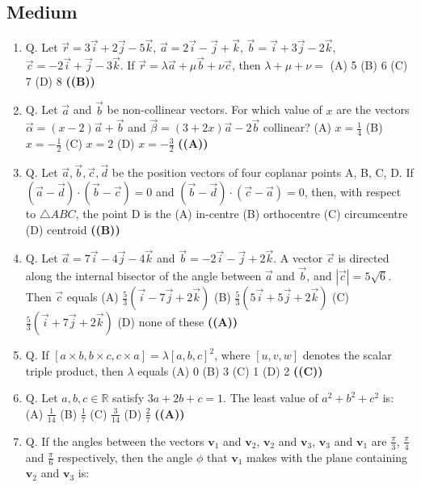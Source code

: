 \documentclass{article}
\begin{document}
\subsection{Medium}
\begin{enumerate}
\item Q. Let $\vec{r} = 3\vec{i} + 2\vec{j} - 5\vec{k}$, $\vec{a} = 2\vec{i} - \vec{j} + \vec{k}$, $\vec{b} = \vec{i} + 3\vec{j} - 2\vec{k}$, $\vec{c} = -2\vec{i} + \vec{j} - 3\vec{k}$. If $\vec{r} = \lambda\vec{a} + \mu\vec{b} + \nu\vec{c}$, then $\lambda + \mu + \nu =$
(A) 5
(B) 6
(C) 7
(D) 8 \hfill \textbf{((B))}
\item Q. Let $\vec{a}$ and $\vec{b}$ be non-collinear vectors. For which value of $x$ are the vectors $\vec{\alpha} = (x - 2)\vec{a} + \vec{b}$ and $\vec{\beta} = (3 + 2x)\vec{a} - 2\vec{b}$ collinear?
(A) $x = \frac{1}{4}$
(B) $x = -\frac{1}{2}$
(C) $x= 2$
(D) $x = -\frac{3}{2}$ \hfill \textbf{((A))}
\item Q. Let $\vec{a}, \vec{b}, \vec{c}, \vec{d}$ be the position vectors of four coplanar points A, B, C, D. If $(\vec{a} - \vec{d}) \cdot (\vec{b} - \vec{c}) = 0$ and $(\vec{b} - \vec{d}) \cdot (\vec{c} - \vec{a}) = 0$, then, with respect to $\triangle ABC$, the point D is the
(A) in-centre
(B) orthocentre
(C) circumcentre
(D) centroid \hfill \textbf{((B))}
\item Q. Let $\vec{a} = 7\vec{i} - 4\vec{j} - 4\vec{k}$ and $\vec{b} = -2\vec{i} - \vec{j} + 2\vec{k}$. A vector $\vec{c}$ is directed along the internal bisector of the angle between $\vec{a}$ and $\vec{b}$, and $|\vec{c}| = 5\sqrt{6}$. Then $\vec{c}$ equals
(A) $\frac{5}{3}(\vec{i}-7\vec{j}+2\vec{k})$
(B) $\frac{5}{3}(5\vec{i}+5\vec{j}+2\vec{k})$
(C) $\frac{5}{3}(\vec{i}+7\vec{j}+2\vec{k})$
(D) none of these \hfill \textbf{((A))}
\item Q. If $[a \times b, b \times c, c \times a] = \lambda [a, b, c]^2$, where $[u, v, w]$ denotes the scalar triple product, then $\lambda$ equals
(A) 0
(B) 3
(C) 1
(D) 2 \hfill \textbf{((C))}
\item Q. Let $a, b, c \in \mathbb{R}$ satisfy $3a + 2b + c = 1$. The least value of $a^2 + b^2 + c^2$ is:
(A) $\frac{1}{14}$
(B) $\frac{1}{7}$
(C) $\frac{3}{14}$
(D) $\frac{2}{7}$ \hfill \textbf{((A))}
\item Q. If the angles between the vectors $\mathbf{v}_1$ and $\mathbf{v}_2$, $\mathbf{v}_2$ and $\mathbf{v}_3$, $\mathbf{v}_3$ and $\mathbf{v}_1$ are $\frac{\pi}{3}$, $\frac{\pi}{4}$ and $\frac{\pi}{6}$ respectively, then the angle $\phi$ that $\mathbf{v}_1$ makes with the plane containing $\mathbf{v}_2$ and $\mathbf{v}_3$ is:

\end{enumerate}
\end{document}
